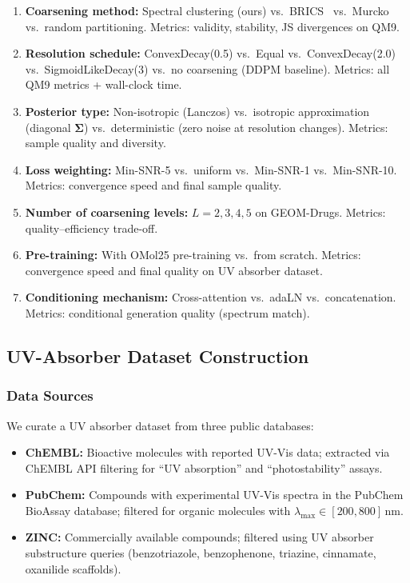\documentclass[12pt,a4paper]{article}
\newcommand{\bSigma}{\bm{\Sigma}}
\begin{document}
\begin{enumerate}
    \item \textbf{Coarsening method:} Spectral clustering (ours) vs.\ BRICS~\cite{degen2008brics} vs.\ Murcko~\cite{bemis1996murcko} vs.\ random partitioning. Metrics: validity, stability, JS divergences on QM9.

    \item \textbf{Resolution schedule:} ConvexDecay(0.5) vs.\ Equal vs.\ ConvexDecay(2.0) vs.\ SigmoidLikeDecay(3) vs.\ no coarsening (DDPM baseline). Metrics: all QM9 metrics + wall-clock time.

    \item \textbf{Posterior type:} Non-isotropic (Lanczos) vs.\ isotropic approximation (diagonal $\bSigma$) vs.\ deterministic (zero noise at resolution changes). Metrics: sample quality and diversity.

    \item \textbf{Loss weighting:} Min-SNR-5 vs.\ uniform vs.\ Min-SNR-1 vs.\ Min-SNR-10. Metrics: convergence speed and final sample quality.

    \item \textbf{Number of coarsening levels:} $L = 2, 3, 4, 5$ on GEOM-Drugs. Metrics: quality--efficiency trade-off.

    \item \textbf{Pre-training:} With OMol25 pre-training vs.\ from scratch. Metrics: convergence speed and final quality on UV absorber dataset.

    \item \textbf{Conditioning mechanism:} Cross-attention vs.\ adaLN vs.\ concatenation. Metrics: conditional generation quality (spectrum match).
\end{enumerate}

\subsection{UV-Absorber Dataset Construction}\label{sec:uv_dataset}

\subsubsection{Data Sources}

We curate a UV absorber dataset from three public databases:
\begin{itemize}
    \item \textbf{ChEMBL:} Bioactive molecules with reported UV-Vis data; extracted via ChEMBL API filtering for ``UV absorption'' and ``photostability'' assays.
    \item \textbf{PubChem:} Compounds with experimental UV-Vis spectra in the PubChem BioAssay database; filtered for organic molecules with $\lambda_{\max} \in [200, 800]$\,nm.
    \item \textbf{ZINC:} Commercially available compounds; filtered using UV absorber substructure queries (benzotriazole, benzophenone, triazine, cinnamate, oxanilide scaffolds).
\end{itemize}
\end{document}
